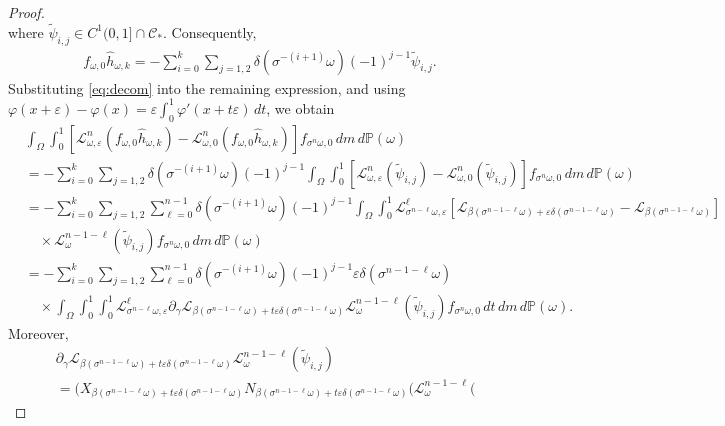 \documentclass[12pt,reqno,a4paper]{article}
\newcommand{\ve}{\varepsilon}
\newcommand\cL{{\mathcal L}}
\newcommand\bP{{\mathbb P}}
\newcommand\cC{{\mathcal C}}
\begin{document}
\begin{proof}
$$	$$
	where $\tilde{\psi}_{i,j} \in C^1(0,1] \cap \cC_*$. Consequently,
	\begin{align}\label{eq:decom}
		f_{\omega, 0} \hat{h}_{\omega, k} = - \sum_{i=0}^k \sum_{j=1,2} 
		\delta( \sigma^{-(i+1)} \omega ) (-1)^{j - 1 } \tilde{\psi}_{i,j}.
	\end{align}
	Substituting \eqref{eq:decom} into the remaining expression, and using 
	$\varphi(x + \ve) - \varphi(x) = \ve \int_{0}^1 \varphi'( x +  t \ve) \, dt$,
	we obtain
	\begin{align*}
		&\int_\Omega \int_0^1 
		[ \cL_{\omega, \ve}^n ( f_{\omega, 0}   \hat{h}_{\omega, k} ) 
		- \cL_{\omega, 0}^n ( f_{\omega, 0}   \hat{h}_{\omega, k} ) ] 
		f_{\sigma^n\omega, 0} \, d m \, d \bP(\omega) \\
		&= - \sum_{i=0}^k \sum_{j=1,2}
		\delta( \sigma^{ - ( i + 1 ) } \omega ) (-1)^{j - 1 }
		\int_\Omega \int_0^1 
		[ \cL_{\omega, \ve}^n (   \tilde{\psi}_{i,j}  ) 
		- \cL_{\omega, 0}^n (    \tilde{\psi}_{i,j}   ) ] 
		f_{\sigma^n\omega, 0} \, d m \, d \bP(\omega) \\
		&= - \sum_{i=0}^k \sum_{j=1,2} \sum_{\ell = 0}^{ n - 1}
		\delta( \sigma^{ - ( i + 1 ) } \omega ) (-1)^{j - 1 }
		\int_\Omega \int_0^1 
		\cL_{ \sigma^{n -  \ell } \omega, \ve }^\ell [ \cL_{ \beta( \sigma^{n-1-\ell} \omega  ) + \ve \delta(\sigma^{n-1-\ell}  \omega ) } - \cL_{ \beta( \sigma^{n-1-\ell} \omega  ) }   ]   \\
		&\quad \times \cL_{ \omega }^{n-1-\ell} ( \tilde{\psi}_{i,j} )
		f_{\sigma^n\omega, 0} \, d m \, d \bP(\omega) \\
		&= - \sum_{i=0}^k \sum_{j=1,2} \sum_{\ell = 0}^{ n - 1}
		\delta( \sigma^{ - ( i + 1 ) } \omega ) (-1)^{j - 1 }
		\ve \delta(\sigma^{n-1-\ell}  \omega ) \\
		&\quad \times \int_\Omega \int_0^1 \int_0^1
		\cL_{ \sigma^{n -  \ell } \omega, \ve }^\ell \partial_\gamma \cL_{ \beta( \sigma^{n-1-\ell} \omega  ) + t \ve \delta(\sigma^{n-1-\ell}  \omega ) }   \cL_{ \omega }^{n-1-\ell} ( \tilde{\psi}_{i,j} ) 
		f_{\sigma^n\omega, 0} \,  dt \, d m \, d \bP(\omega).
	\end{align*}
	Moreover,
	\begin{align*}
		&\partial_\gamma \cL_{ \beta( \sigma^{n-1-\ell} \omega  ) + t \ve \delta(\sigma^{n-1-\ell}  \omega ) }   \cL_{ \omega }^{n-1-\ell} ( 
		\tilde{\psi}_{i,j} ) \\
		&= ( X_{  \beta( \sigma^{n-1-\ell} \omega  ) + t \ve \delta(\sigma^{n-1-\ell}  \omega ) } N_{  \beta( \sigma^{n-1-\ell} \omega  ) + t \ve \delta(\sigma^{n-1-\ell}  \omega ) } (   \cL_{ \omega }^{n-1-\ell} ( 

\end{align*}
\end{proof}
\end{document}
